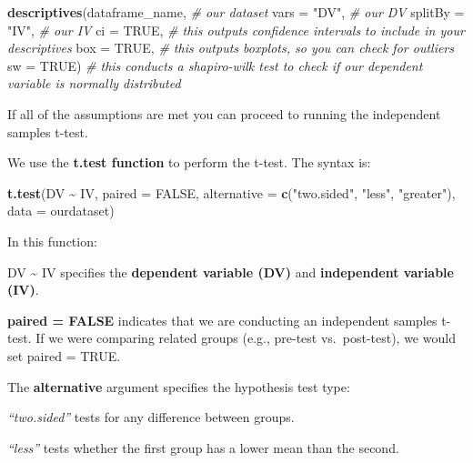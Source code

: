 \documentclass[
]{book}
\newenvironment{Shaded}{\begin{snugshade}}{\end{snugshade}}
\newcommand{\AttributeTok}[1]{\textcolor[rgb]{0.13,0.29,0.53}{#1}}
\newcommand{\CommentTok}[1]{\textcolor[rgb]{0.56,0.35,0.01}{\textit{#1}}}
\newcommand{\ConstantTok}[1]{\textcolor[rgb]{0.56,0.35,0.01}{#1}}
\newcommand{\FunctionTok}[1]{\textcolor[rgb]{0.13,0.29,0.53}{\textbf{#1}}}
\newcommand{\NormalTok}[1]{#1}
\newcommand{\SpecialCharTok}[1]{\textcolor[rgb]{0.81,0.36,0.00}{\textbf{#1}}}
\newcommand{\StringTok}[1]{\textcolor[rgb]{0.31,0.60,0.02}{#1}}
\begin{document}
\begin{Shaded}
\begin{Highlighting}[]
\FunctionTok{descriptives}\NormalTok{(dataframe\_name, }\CommentTok{\# our dataset}
             \AttributeTok{vars =} \StringTok{"DV"}\NormalTok{, }\CommentTok{\# our DV}
             \AttributeTok{splitBy =} \StringTok{"IV"}\NormalTok{, }\CommentTok{\# our IV}
             \AttributeTok{ci =} \ConstantTok{TRUE}\NormalTok{, }\CommentTok{\# this outputs confidence intervals to include in your descriptives}
             \AttributeTok{box =} \ConstantTok{TRUE}\NormalTok{, }\CommentTok{\# this outputs boxplots, so you can check for outliers}
             \AttributeTok{sw =} \ConstantTok{TRUE}\NormalTok{) }\CommentTok{\# this conducts a shapiro{-}wilk test to check if our dependent variable is normally distributed }
\end{Highlighting}
\end{Shaded}

If all of the assumptions are met you can proceed to running the independent samples t-test.

We use the \textbf{t.test function} to perform the t-test. The syntax is:

\begin{Shaded}
\begin{Highlighting}[]
\FunctionTok{t.test}\NormalTok{(DV }\SpecialCharTok{\textasciitilde{}}\NormalTok{ IV, }
       \AttributeTok{paired =} \ConstantTok{FALSE}\NormalTok{,}
       \AttributeTok{alternative =} \FunctionTok{c}\NormalTok{(}\StringTok{"two.sided"}\NormalTok{, }\StringTok{"less"}\NormalTok{, }\StringTok{"greater"}\NormalTok{),}
       \AttributeTok{data =}\NormalTok{ ourdataset)}
\end{Highlighting}
\end{Shaded}

In this function:

DV \textasciitilde{} IV specifies the \textbf{dependent variable (DV)} and \textbf{independent variable (IV)}.

\textbf{paired = FALSE} indicates that we are conducting an independent samples t-test. If we were comparing related groups (e.g., pre-test vs.~post-test), we would set paired = TRUE.

The \textbf{alternative} argument specifies the hypothesis test type:

\emph{``two.sided''} tests for any difference between groups.

\emph{``less''} tests whether the first group has a lower mean than the second.
\end{document}

